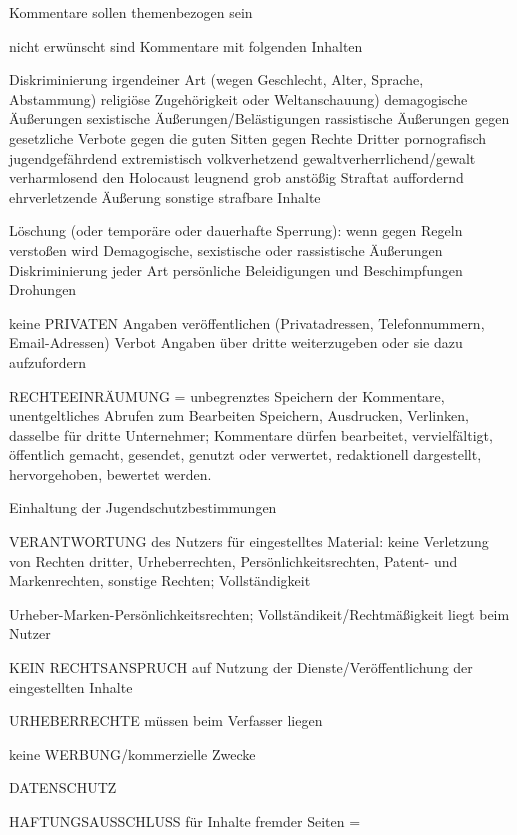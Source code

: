 Kommentare sollen themenbezogen sein

nicht erwünscht sind Kommentare mit folgenden Inhalten

Diskriminierung irgendeiner Art (wegen Geschlecht, Alter, Sprache, Abstammung) religiöse Zugehörigkeit oder Weltanschauung)
demagogische Äußerungen
sexistische Äußerungen/Belästigungen
rassistische Äußerungen 
gegen gesetzliche Verbote
gegen die guten Sitten 
gegen Rechte Dritter
pornografisch
jugendgefährdend
extremistisch
volkverhetzend
gewaltverherrlichend/gewalt verharmlosend
den Holocaust leugnend
grob anstößig
Straftat auffordernd 
ehrverletzende Äußerung
sonstige strafbare Inhalte


Löschung (oder temporäre oder dauerhafte Sperrung): wenn gegen Regeln verstoßen wird
Demagogische, sexistische oder rassistische Äußerungen
Diskriminierung jeder Art
persönliche Beleidigungen und Beschimpfungen
Drohungen

keine PRIVATEN Angaben veröffentlichen (Privatadressen, Telefonnummern, Email-Adressen)
Verbot Angaben über dritte weiterzugeben oder sie dazu aufzufordern

RECHTEEINRÄUMUNG =
unbegrenztes Speichern der Kommentare, unentgeltliches Abrufen zum Bearbeiten Speichern, Ausdrucken, Verlinken, dasselbe für dritte Unternehmer; Kommentare dürfen bearbeitet, vervielfältigt, öffentlich gemacht, gesendet, genutzt oder verwertet, redaktionell dargestellt, hervorgehoben, bewertet werden.


Einhaltung der Jugendschutzbestimmungen

VERANTWORTUNG des Nutzers für eingestelltes Material: 
keine Verletzung von Rechten dritter, Urheberrechten, Persönlichkeitsrechten, Patent- und Markenrechten, sonstige Rechten; Vollständigkeit

Urheber-Marken-Persönlichkeitsrechten; Vollständikeit/Rechtmäßigkeit liegt beim Nutzer

KEIN RECHTSANSPRUCH auf Nutzung der Dienste/Veröffentlichung der eingestellten Inhalte

URHEBERRECHTE müssen beim Verfasser liegen

keine WERBUNG/kommerzielle Zwecke

DATENSCHUTZ

HAFTUNGSAUSSCHLUSS für Inhalte fremder Seiten =
